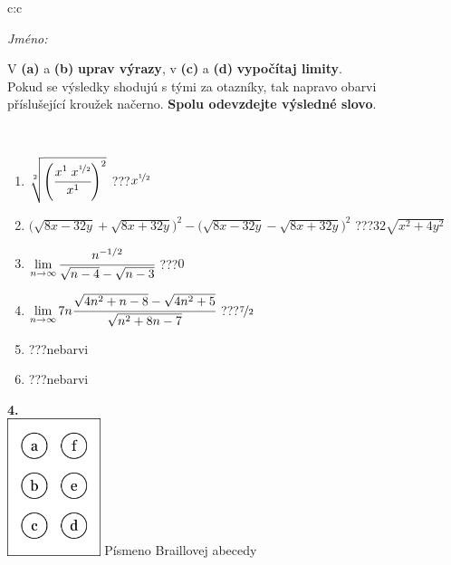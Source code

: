 \documentclass[10pt]{report}
\begin{document}
\begin{tabular}{c:c}
\begin{minipage}[c][104.5mm][t]{0.5\linewidth}
\begin{center}
\textit{Jméno:}\phantom{xxxxxxxxxxxxxxxxxxxxxxxxxxxxxxxxxxxxxxxxxxxxxxxxxxxxxxxxxxxxxxxxx}\\[5mm]
\begin{minipage}{0.95\linewidth}
\begin{center}
V \textbf{(a)} a \textbf{(b)} \textbf{uprav výrazy}, v \textbf{(c)} a \textbf{(d)} \textbf{vypočítaj limity}.\\Pokud se výsledky shodujú s tými za otazníky, tak napravo obarvi\\příslušející kroužek načerno. \textbf{Spolu odevzdejte výsledné slovo}.
\end{center}
\end{minipage}
\\[1mm]
\begin{minipage}{0.79\linewidth}
\begin{center}
\begin{varwidth}{\linewidth}
\begin{enumerate}
\small
\item $\sqrt[2]{\left(\cfrac{x^{1}\;x^{\nicefrac{1}{2}}}{x^{1}}\right)^{2}}$\quad \dotfill\; ???\;\dotfill \quad $x^{\nicefrac{1}{2}}$
\item {\footnotesize{\scriptsize$\big(\sqrt{8x-32y}+\sqrt{8x+32y}\big)^2-\big(\sqrt{8x-32y}-\sqrt{8x+32y}\big)^2$}\quad \dotfill\; ???\;\dotfill \quad $32\sqrt{x^2+4y^2}$}
\item $\lim\limits_{n\to\infty}\cfrac{n^{-1/2}}{\sqrt{n-4}-\sqrt{n-3}}$\quad \dotfill\; ???\;\dotfill \quad $0$
\item $\lim\limits_{n\to\infty}7n\cfrac{\sqrt{4n^2+n-8}-\sqrt{4n^2+5}}{\sqrt{n^2+8n-7}}$\quad \dotfill\; ???\;\dotfill \quad $\nicefrac{7}{2}$
\item \quad \dotfill\; ???\;\dotfill \quad nebarvi
\item \quad \dotfill\; ???\;\dotfill \quad nebarvi
\end{enumerate}
\end{varwidth}
\end{center}
\end{minipage}
\begin{minipage}{0.20\linewidth}
\begin{center}
{\Huge\bfseries 4.} \\[2mm]
\includegraphics[height=40mm]{../images/braille.png}
{\small Písmeno Braillovej abecedy}
\end{center}
\end{minipage}
\end{center}
\end{minipage}
%
\end{tabular}
\end{document}
